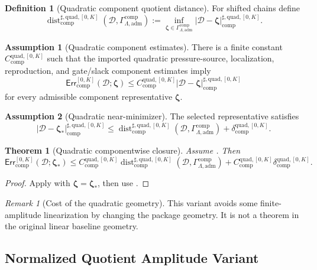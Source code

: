 \documentclass[11pt]{article}
\numberwithin{equation}{section}
\newtheorem{theorem}{Theorem}[section]
\theoremstyle{definition}
\newtheorem{definition}[definition]{Definition}
\newtheorem{assumption}[assumption]{Assumption}
\theoremstyle{remark}
\newtheorem{remark}[remark]{Remark}
\newcommand{\adm}{\mathrm{adm}}
\newcommand{\comp}{\mathrm{comp}}
\newcommand{\quadg}{\mathrm{quad}}
\newcommand{\Err}{\mathsf{Err}}
\newcommand{\Dist}{\operatorname{dist}}
\newcommand{\calD}{\mathcal D}
\newcommand{\bzeta}{\boldsymbol\zeta}
\newcommand{\Gcomp}{\Gamma_{\Lambda,\adm}^{\comp}}
\begin{document}
\begin{definition}[Quadratic component quotient distance]
\label{comp:def:quadratic-component-distance}
For shifted chains define
\[
    \Dist_{\comp}^{\sharp,\quadg,[0,K]}(\calD,\Gcomp)
    :=
    \inf_{\bzeta\in\Gcomp}
    |\calD-\bzeta|_{\comp}^{\sharp,\quadg,[0,K]}.
\]
\end{definition}

\begin{assumption}[Quadratic component estimates]
\label{comp:ass:quadratic-component-estimates}
There is a finite constant \(C_{\comp}^{\quadg,[0,K]}\) such that the imported
quadratic pressure-source, localization, reproduction, and gate/slack component
estimates imply
\[
    \Err_{\comp}^{[0,K]}(\calD;\bzeta)
    \le
    C_{\comp}^{\quadg,[0,K]}
    |\calD-\bzeta|_{\comp}^{\sharp,\quadg,[0,K]}
\]
for every admissible component representative \(\bzeta\).
\end{assumption}

\begin{assumption}[Quadratic near-minimizer]
\label{comp:ass:quadratic-near-minimizer}
The selected representative satisfies
\[
    |\calD-\bzeta_*|_{\comp}^{\sharp,\quadg,[0,K]}
    \le
    \Dist_{\comp}^{\sharp,\quadg,[0,K]}(\calD,\Gcomp)
    +
    \delta_{\comp}^{\quadg,[0,K]}.
\]
\end{assumption}

\begin{theorem}[Quadratic componentwise closure]
\label{comp:thm:quadratic-component-target}
Assume
.  Then
\[
    \Err_{\comp}^{[0,K]}(\calD;\bzeta_*)
    \le
    C_{\comp}^{\quadg,[0,K]}
    \Dist_{\comp}^{\sharp,\quadg,[0,K]}(\calD,\Gcomp)
    +
    C_{\comp}^{\quadg,[0,K]}
    \delta_{\comp}^{\quadg,[0,K]}.
\]
\end{theorem}

\begin{proof}
Apply  with
\(\bzeta=\bzeta_*\), then use .
\end{proof}

\begin{remark}[Cost of the quadratic geometry]
This variant avoids some finite-amplitude linearization by changing the
package geometry.  It is not a theorem in the original linear baseline
geometry.
\end{remark}

\subsection{Normalized Quotient Amplitude Variant}
\label{comp:sec:amplitude}
\end{document}
